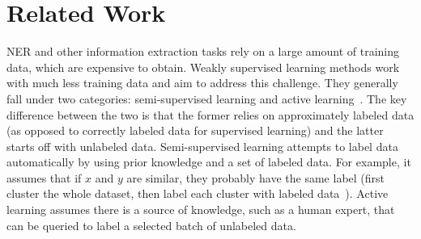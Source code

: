 \section{Related Work}
\label{sect:apner_related}
NER and other information extraction tasks rely on a large amount of training data, which are expensive to obtain.
Weakly supervised learning methods work with much less training data and aim to address this challenge.
They generally fall under two categories: semi-supervised learning and active learning~\cite{zhou2017brief}.
The key difference between the two is that the former relies on approximately labeled data (as opposed to correctly labeled data for supervised learning) and the latter starts off with unlabeled data.
Semi-supervised learning attempts to label data automatically by using prior knowledge and a set of labeled data. 
For example, it assumes that if $x$ and $y$ are similar, they probably have the same label (first cluster the whole dataset, then label each cluster with labeled data~\cite{zhu2005semi}).
Active learning assumes there is a source of knowledge, such as a human expert, that can be queried 
to label a selected batch of unlabeled data. 

